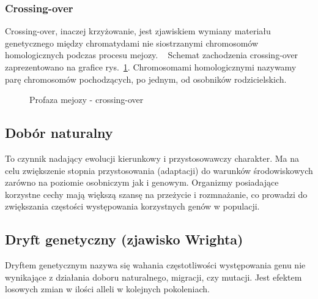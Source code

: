 \documentclass[twoside,a4paper,10]{book}
\begin{document}
           \subsubsection{ Crossing-over} 
Crossing-over, inaczej krzyżowanie,  jest zjawiskiem wymiany materiału genetycznego między chromatydami 
nie siostrzanymi chromosomów homologicznych podczas procesu mejozy. ~\cite{bioDicWeb} Schemat zachodzenia crossing-over zaprezentowano na grafice rys.~\ref{fig:crossingover}. Chromosomami homologicznymi nazywamy parę chromosomów pochodzących, po jednym, od osobników rodzicielskich. 
\begin{figure}[!h]
		\centering
		\caption{Profaza mejozy - crossing-over}
		\label{fig:crossingover}
\end{figure}

\subsection{Dobór naturalny}
    To czynnik nadający ewolucji kierunkowy i przystosowawczy charakter. Ma na celu zwiększenie stopnia przystosowania (adaptacji) do warunków środowiskowych 
zarówno na poziomie osobniczym jak i genowym.
 Organizmy posiadające korzystne cechy mają większą szansę na przeżycie 
i rozmnażanie, co prowadzi do zwiększania częstości występowania korzystnych genów 
w populacji.
\subsection{ Dryft genetyczny (zjawisko Wrighta) }
    Dryftem genetycznym nazywa się wahania częstotliwości występowania genu 
nie wynikające z działania doboru naturalnego, migracji, czy mutacji. Jest efektem losowych zmian w ilości alleli w kolejnych pokoleniach. ~\cite{encykBio}
\end{document}
